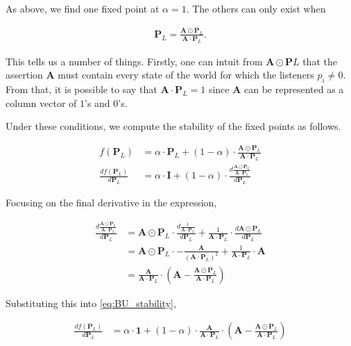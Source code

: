 As above, we find one fixed point at $\alpha = 1$. The others can only exist when

\begin{align*}
    \mathbf{P}_L = \frac{\mathbf{A} \odot \mathbf{P}_L}{\mathbf{A} \cdot \mathbf{P}_L}.
\end{align*}

This tells us a number of things. Firstly, one can intuit from $\mathbf{A} \odot \mathbf{P}L$ that the assertion $\mathbf{A}$ must contain every state of the world for which the listeners $p_i \neq 0$. From that, it is possible to say that $\mathbf{A} \cdot \mathbf{P}_L = 1$ since $\mathbf{A}$ can be represented as a column vector of $1$'s and $0$'s. 

Under these conditions, we compute the stability of the fixed points as follows. 

\begin{align}
    f(\mathbf{P}_L) &= \alpha \cdot \mathbf{P}_L + (1 - \alpha) \cdot \frac{\mathbf{A} \odot \mathbf{P}_L}{\mathbf{A} \cdot \mathbf{P}_L}\\
    \frac{d f(\mathbf{P}_L)}{d \mathbf{P}_L} &= \alpha \cdot \mathbf{I} + (1 - \alpha) \cdot \frac{d \frac{\mathbf{A} \odot \mathbf{P}_L}{\mathbf{A} \cdot \mathbf{P}_L}}{d \mathbf{P}_L}\label{eq:BU_stability}
\end{align}

Focusing on the final derivative in the expression, 

\begin{align*}
    \frac{d \frac{\mathbf{A} \odot \mathbf{P}_L}{\mathbf{A} \cdot \mathbf{P}_L}}{d \mathbf{P}_L} &= \mathbf{A} \odot \mathbf{P}_L \cdot \frac{d \frac{1}{\mathbf{A} \cdot \mathbf{P}_L}}{d \mathbf{P}_L} + \frac{1}{\mathbf{A} \cdot \mathbf{P}_L} \cdot \frac{d \mathbf{A} \odot \mathbf{P}_L}{d \mathbf{P}_L}  \\
    &= \mathbf{A} \odot \mathbf{P}_L \cdot - \frac{\mathbf{A}}{(\mathbf{A} \cdot \mathbf{P}_L)^2} + \frac{1}{\mathbf{A} \cdot \mathbf{P}_L} \cdot \mathbf{A} \\
    &= \frac{\mathbf{A}}{\mathbf{A} \cdot \mathbf{P}_L} \cdot \left(  \mathbf{A} - \frac{\mathbf{A} \odot \mathbf{P}_L}{\mathbf{A} \cdot \mathbf{P}_L}  \right)
\end{align*}



Substituting this into \cref{eq:BU_stability},

\begin{align*}
    \frac{d f(\mathbf{P}_L)}{d \mathbf{P}_L} &= \alpha \cdot \mathbf{1} + (1 - \alpha) \cdot  \frac{\mathbf{A}}{\mathbf{A} \cdot \mathbf{P}_L} \cdot \left(  \mathbf{A} - \frac{\mathbf{A} \odot \mathbf{P}_L}{\mathbf{A} \cdot \mathbf{P}_L}  \right) \\
\end{align*}

